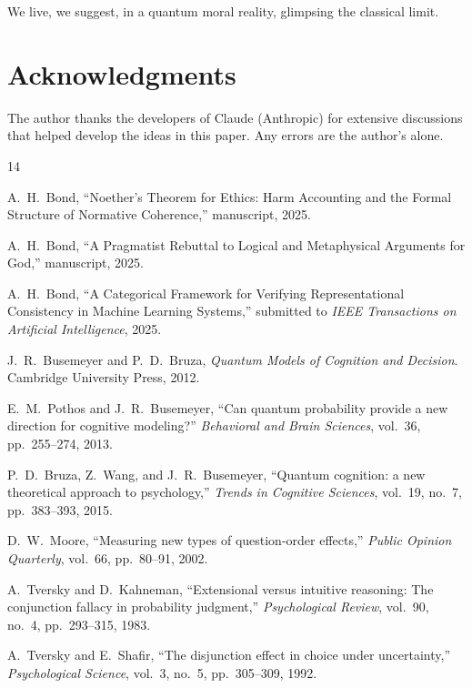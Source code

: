 \documentclass[12pt]{article}
\begin{document}
We live, we suggest, in a quantum moral reality, glimpsing the classical limit.

\section*{Acknowledgments}

The author thanks the developers of Claude (Anthropic) for extensive discussions that helped develop the ideas in this paper. Any errors are the author's alone.

\begin{thebibliography}{14}

A.~H.~Bond, ``Noether's Theorem for Ethics: Harm Accounting and the Formal Structure of Normative Coherence,'' manuscript, 2025.

A.~H.~Bond, ``A Pragmatist Rebuttal to Logical and Metaphysical Arguments for God,'' manuscript, 2025.

A.~H.~Bond, ``A Categorical Framework for Verifying Representational Consistency in Machine Learning Systems,'' submitted to \emph{IEEE Transactions on Artificial Intelligence}, 2025.

J.~R.~Busemeyer and P.~D.~Bruza, \emph{Quantum Models of Cognition and Decision}. Cambridge University Press, 2012.

E.~M.~Pothos and J.~R.~Busemeyer, ``Can quantum probability provide a new direction for cognitive modeling?'' \emph{Behavioral and Brain Sciences}, vol.~36, pp.~255--274, 2013.

P.~D.~Bruza, Z.~Wang, and J.~R.~Busemeyer, ``Quantum cognition: a new theoretical approach to psychology,'' \emph{Trends in Cognitive Sciences}, vol.~19, no.~7, pp.~383--393, 2015.

D.~W.~Moore, ``Measuring new types of question-order effects,'' \emph{Public Opinion Quarterly}, vol.~66, pp.~80--91, 2002.

A.~Tversky and D.~Kahneman, ``Extensional versus intuitive reasoning: The conjunction fallacy in probability judgment,'' \emph{Psychological Review}, vol.~90, no.~4, pp.~293--315, 1983.

A.~Tversky and E.~Shafir, ``The disjunction effect in choice under uncertainty,'' \emph{Psychological Science}, vol.~3, no.~5, pp.~305--309, 1992.


\end{thebibliography}
\end{document}
